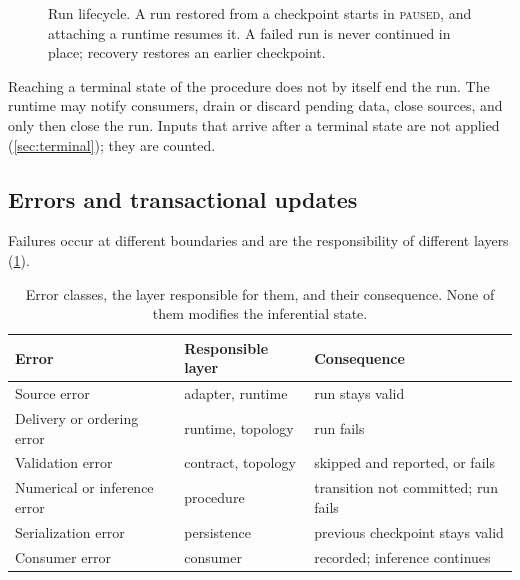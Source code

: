 \documentclass[11pt,a4paper]{article}
\theoremstyle{definition}
\theoremstyle{remark}
\begin{document}
\begin{figure}[t]
\centering
{}
\caption{
Run lifecycle. A run restored from a checkpoint starts in
\textsc{paused}, and attaching a runtime resumes it. A failed run is
never continued in place; recovery restores an earlier checkpoint.
}
\label{fig:lifecycle}
\end{figure}

Reaching a terminal state of the procedure does not by itself end the
run. The runtime may notify consumers, drain or discard pending data,
close sources, and only then close the run. Inputs that arrive after a
terminal state are not applied (\cref{sec:terminal}); they are counted.

\subsection{Errors and transactional updates}
\label{sec:errors}

Failures occur at different boundaries and are the responsibility of
different layers (\cref{tab:errors}).

\begin{table}[t]
\centering
\caption{Error classes, the layer responsible for them, and their
consequence. None of them modifies the inferential state.}
\label{tab:errors}
\begin{tabular}{lll}
\toprule
\textbf{Error} & \textbf{Responsible layer} & \textbf{Consequence} \\
\midrule
Source error & adapter, runtime & run stays valid \\
Delivery or ordering error & runtime, topology & run fails \\
Validation error & contract, topology & skipped and reported, or fails \\
Numerical or inference error & procedure & transition not committed; run fails \\
Serialization error & persistence & previous checkpoint stays valid \\
Consumer error & consumer & recorded; inference continues \\
\bottomrule
\end{tabular}
\end{table}
\end{document}
